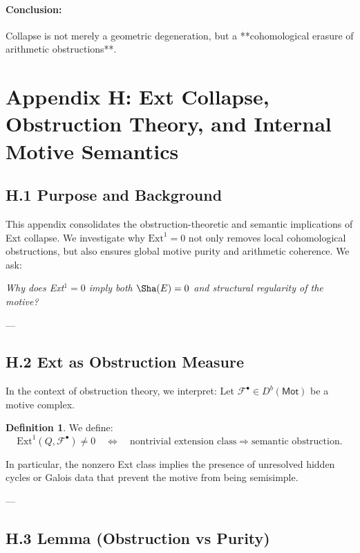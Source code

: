 \documentclass[11pt]{article}
\theoremstyle{definition}
\newtheorem{definition}[theorem]{Definition}
\begin{document}
\paragraph{Conclusion:}  
Collapse is not merely a geometric degeneration, but a **cohomological erasure of arithmetic obstructions**.



\section*{Appendix H: Ext Collapse, Obstruction Theory, and Internal Motive Semantics}

\subsection*{H.1 Purpose and Background}

This appendix consolidates the obstruction-theoretic and semantic implications of Ext collapse.  
We investigate why \( \mathrm{Ext}^1 = 0 \) not only removes local cohomological obstructions, but also ensures global motive purity and arithmetic coherence.  
We ask:

\begin{center}
\textit{Why does Ext$^1 = 0$ imply both $\Sha(E) = 0$ and structural regularity of the motive?}
\end{center}

---

\subsection*{H.2 Ext as Obstruction Measure}

In the context of obstruction theory, we interpret:
Let \( \mathcal{F}^\bullet \in D^b(\mathsf{Mot}) \) be a motive complex.

\begin{definition}
We define:
\[
\mathrm{Ext}^1(Q, \mathcal{F}^\bullet) \neq 0 \quad \Leftrightarrow \quad 
\text{nontrivial extension class} \Rightarrow \text{semantic obstruction}.
\]
\end{definition}

In particular, the nonzero Ext class implies the presence of unresolved hidden cycles or Galois data  
that prevent the motive from being semisimple.

---

\subsection*{H.3 Lemma (Obstruction vs Purity)}
\end{document}
